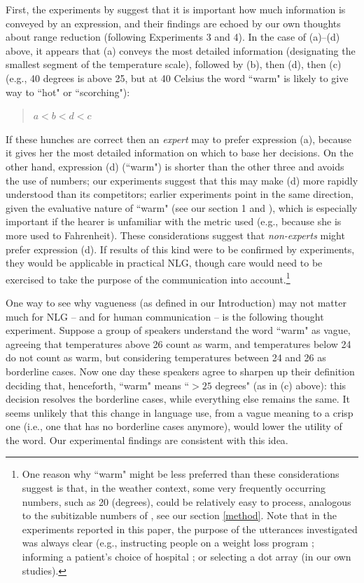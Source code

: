 \documentclass[%
man,		%
floatsintext,%
apacite%
]{apa6}
\begin{document}
First, the experiments by \citeauthor{Mishra01042011} suggest that it is important how much information is conveyed by an expression, and their findings are echoed by our own thoughts about range reduction (following Experiments 3 and 4). In the case of (a)--(d) above, it appears that (a) conveys the most detailed information (designating the smallest segment of the temperature scale), followed by (b), then (d), then (c) (e.g., 40 degrees is above 25, but at 40 Celsius the word ``warm" is likely to give way to ``hot" or ``scorching"): 
%
\begin{quote}
$a < b < d < c$
\end{quote}
%
If these hunches are correct then an {\em expert} may  to prefer expression (a), because it gives her the most detailed information on which to base her decisions. On the other hand, expression (d) (``warm") is shorter than the other three and avoids the use of numbers; our experiments suggest that this may make (d) more rapidly understood than its competitors; earlier experiments point in the same direction, given the evaluative nature of ``warm" (see our section 1 and  ), which is especially important if the hearer is unfamiliar with the metric used (e.g., because she is more used to Fahrenheit). These considerations suggest that {\em non-experts} might prefer expression (d). If results of this kind were to be confirmed by experiments, they would be applicable in practical NLG, though care would need to be exercised to take the purpose of the communication into account.\footnote{One reason why ``warm" might be less preferred than these considerations suggest is that, in the weather context, some very frequently occurring numbers, such as 20 (degrees), could be relatively easy to process, analogous to the subitizable numbers of \protect{}, see our section \ref{method}. Note that in the experiments reported in this paper, the purpose of the utterances investigated was always clear (e.g., instructing people on a weight loss program \cite{Mishra01042011}; informing a patient's choice of hospital \cite{peters2009bringing}; or selecting a dot array (in our own studies).} 

One way to see why vagueness (as defined in our Introduction) may not matter much for NLG -- and for human communication -- is the following thought experiment. Suppose a group of speakers understand the word ``warm" as vague, agreeing that temperatures above 26 count as warm, and temperatures below 24 do not count as warm, but considering temperatures between 24 and 26 as borderline cases. Now one day these speakers agree to sharpen up their definition deciding that, henceforth, ``warm" means ``$>25$ degrees" (as in (c) above): this decision resolves the borderline cases, while everything else remains the same. It seems unlikely that this change in language use, from a vague meaning to a crisp one (i.e., one that has no borderline cases anymore), would lower the utility of the word. Our experimental findings are consistent with this idea.
\end{document}
